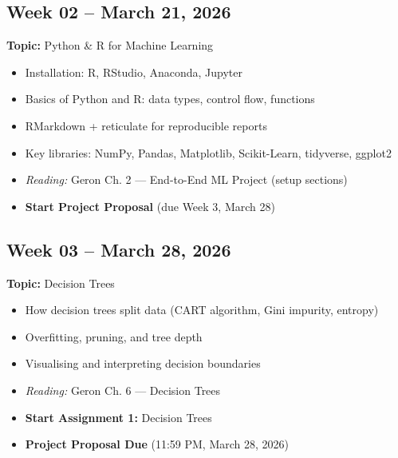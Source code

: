 \documentclass[
  10pt,
]{article}
\providecommand{\tightlist}{%
  \setlength{\itemsep}{0pt}\setlength{\parskip}{0pt}}
\newenvironment{blackbox}{%
  \def\FrameCommand{%
    \hspace{1pt}%
    {\color{boxborder}\vrule width 2pt}%
    {\color{boxbg}\vrule width 4pt}%
    \colorbox{boxbg}%
  }%
  \MakeFramed{\advance\hsize-\width\FrameRestore}%
  \noindent\ignorespaces
}{%
  \endMakeFramed
}
\begin{document}
\begin{blackbox}

\begin{center}

\subsection{Week 02 -- March 21, 2026}\label{week-02-march-21-2026}

\end{center}

\textbf{Topic:} Python \& R for Machine Learning

\begin{itemize}
\tightlist
\item
  Installation: R, RStudio, Anaconda, Jupyter
\item
  Basics of Python and R: data types, control flow, functions
\item
  RMarkdown + reticulate for reproducible reports
\item
  Key libraries: NumPy, Pandas, Matplotlib, Scikit-Learn, tidyverse,
  ggplot2
\item
  \emph{Reading:} Geron Ch. 2 --- End-to-End ML Project (setup sections)
\item
  \textbf{Start Project Proposal} (due Week 3, March 28)
\end{itemize}

\end{blackbox}

\begin{blackbox}

\begin{center}

\subsection{Week 03 -- March 28, 2026}\label{week-03-march-28-2026}

\end{center}

\textbf{Topic:} Decision Trees

\begin{itemize}
\tightlist
\item
  How decision trees split data (CART algorithm, Gini impurity, entropy)
\item
  Overfitting, pruning, and tree depth
\item
  Visualising and interpreting decision boundaries
\item
  \emph{Reading:} Geron Ch. 6 --- Decision Trees
\item
  \textbf{Start Assignment 1:} Decision Trees
\item
  \textbf{Project Proposal Due} (11:59 PM, March 28, 2026)
\end{itemize}

\end{blackbox}
\end{document}
